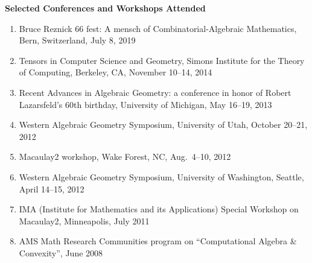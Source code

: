 \documentclass[12pt]{article}
\begin{document}
\textbf{Selected Conferences and Workshops Attended}
\begin{enumerate}[revarabic,labelwidth=*]
\item Bruce Reznick 66 fest: A mensch of Combinatorial-Algebraic Mathematics, Bern, Switzerland, July 8, 2019
\item Tensors in Computer Science and Geometry, Simons Institute for the Theory of Computing, Berkeley, CA, November 10--14, 2014
\item Recent Advances in Algebraic Geometry: a conference in honor of Robert Lazarsfeld's 60th birthday,
University of Michigan, May 16--19, 2013
\item Western Algebraic Geometry Symposium, University of Utah, October 20--21, 2012
\item Macaulay2 workshop, Wake Forest, NC, Aug.~4--10, 2012
\item Western Algebraic Geometry Symposium, University of Washington, Seattle, April 14--15, 2012
\item IMA (Institute for Mathematics and its Applications) Special Workshop on Macaulay2, Minneapolis, July 2011
\item AMS Math Research Communities program on ``Computational Algebra \& Convexity'', June 2008
\end{enumerate}
\end{document}
